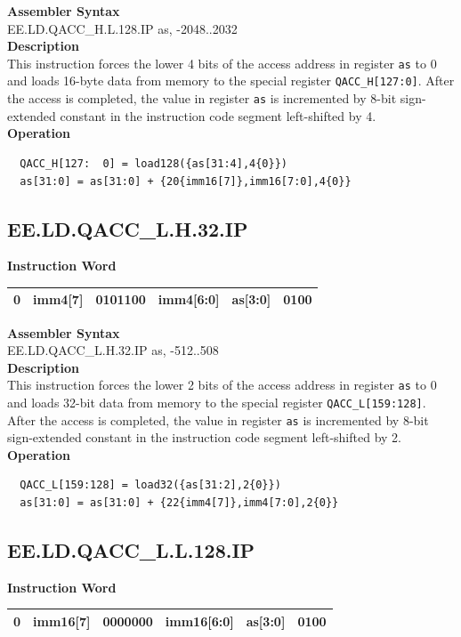 \textbf{Assembler Syntax} \\
EE.LD.QACC\_H.L.128.IP as, -2048..2032 \\
\textbf{Description} \\
This instruction forces the lower 4 bits of the access address in register \lstinline{as} to 0 and loads 16-byte data from memory to the special register \lstinline{QACC_H[127:0]}. After the access is completed, the value in register \lstinline{as} is incremented by 8-bit sign-extended constant in the instruction code segment left-shifted by 4.\\
\textbf{Operation}
\begin{lstlisting}
  QACC_H[127:  0] = load128({as[31:4],4{0}})
  as[31:0] = as[31:0] + {20{imm16[7]},imm16[7:0],4{0}}
\end{lstlisting}

\clearpage
\subsection{EE.LD.QACC\_L.H.32.IP}\label{instruction:EELDQACCLH32IP}
\setlength\tabcolsep{6pt}
\textbf{Instruction Word} \\
\begin{tabular}{|c|c|c|c|c|c|}
	\hline
	0 & imm4[7] & 0101100 & imm4[6:0] & as[3:0] & 0100 \\
	\hline
\end{tabular}

\textbf{Assembler Syntax} \\
EE.LD.QACC\_L.H.32.IP as, -512..508 \\
\textbf{Description} \\
This instruction forces the lower 2 bits of the access address in register \lstinline{as} to 0 and loads 32-bit data from memory to the special register \lstinline{QACC_L[159:128]}. After the access is completed, the value in register \lstinline{as} is incremented by 8-bit sign-extended constant in the instruction code segment left-shifted by 2.\\
\textbf{Operation}
\begin{lstlisting}
  QACC_L[159:128] = load32({as[31:2],2{0}})
  as[31:0] = as[31:0] + {22{imm4[7]},imm4[7:0],2{0}}
\end{lstlisting}

\clearpage
\subsection{EE.LD.QACC\_L.L.128.IP}\label{instruction:EELDQACCLL128IP}
\setlength\tabcolsep{6pt}
\textbf{Instruction Word} \\
\begin{tabular}{|c|c|c|c|c|c|}
	\hline
	0 & imm16[7] & 0000000 & imm16[6:0] & as[3:0] & 0100 \\
	\hline
\end{tabular}


